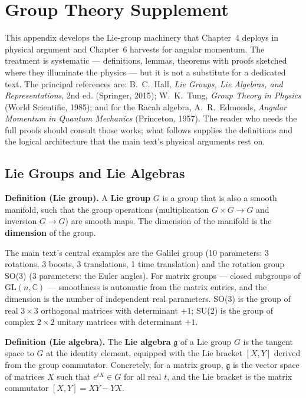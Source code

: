 \chapter{Group Theory Supplement}

\begin{note}
This appendix develops the Lie-group machinery that Chapter~4 deploys in physical argument and Chapter~6 harvests for angular momentum. The treatment is systematic --- definitions, lemmas, theorems with proofs sketched where they illuminate the physics --- but it is not a substitute for a dedicated text. The principal references are: B.~C.~Hall, \emph{Lie Groups, Lie Algebras, and Representations}, 2nd ed. (Springer, 2015); W.~K.~Tung, \emph{Group Theory in Physics} (World Scientific, 1985); and for the Racah algebra, A.~R.~Edmonds, \emph{Angular Momentum in Quantum Mechanics} (Princeton, 1957). The reader who needs the full proofs should consult those works; what follows supplies the definitions and the logical architecture that the main text's physical arguments rest on.
\end{note}

\section{Lie Groups and Lie Algebras}
\label{sec:appendix-lie-groups}

\medskip\noindent\textbf{Definition (Lie group).} A \textbf{Lie group} $G$ is a group that is also a smooth manifold, such that the group operations (multiplication $G \times G \to G$ and inversion $G \to G$) are smooth maps. The dimension of the manifold is the \textbf{dimension} of the group.

The main text's central examples are the Galilei group (10 parameters: 3 rotations, 3 boosts, 3 translations, 1 time translation) and the rotation group SO(3) (3 parameters: the Euler angles). For matrix groups --- closed subgroups of $\mathrm{GL}(n, \mathbb{C})$ --- smoothness is automatic from the matrix entries, and the dimension is the number of independent real parameters. SO(3) is the group of real $3 \times 3$ orthogonal matrices with determinant $+1$; SU(2) is the group of complex $2 \times 2$ unitary matrices with determinant $+1$.

\medskip\noindent\textbf{Definition (Lie algebra).} The \textbf{Lie algebra} $\mathfrak{g}$ of a Lie group $G$ is the tangent space to $G$ at the identity element, equipped with the Lie bracket $[X, Y]$ derived from the group commutator. Concretely, for a matrix group, $\mathfrak{g}$ is the vector space of matrices $X$ such that $e^{tX} \in G$ for all real $t$, and the Lie bracket is the matrix commutator $[X, Y] = XY - YX$.

